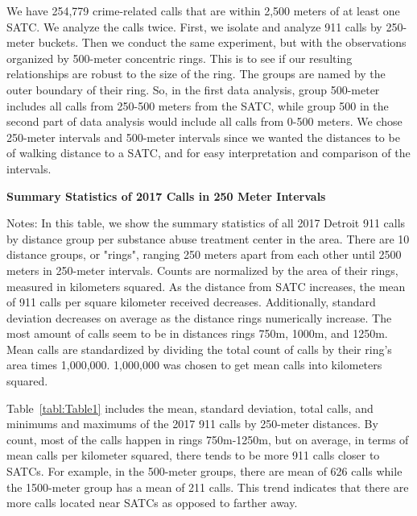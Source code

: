 \documentclass[12pt]{article}
\begin{document}
 We have 254,779 crime-related calls that are within 2,500 meters of at least one SATC. We analyze the calls twice. First, we isolate and analyze 911 calls by 250-meter buckets. Then we conduct the same experiment, but with the observations organized by 500-meter concentric rings. This is to see if our resulting relationships are robust to the size of the ring. The groups are named by the outer boundary of their ring. So, in the first data analysis, group 500-meter includes all calls from 250-500 meters from the SATC, while group 500 in the second part of data analysis would include all calls from 0-500 meters. We chose 250-meter intervals and 500-meter intervals since we wanted the distances to be of walking distance to a SATC, and for easy interpretation and comparison of the intervals. 
\begin{table}[H]
\centering
\scalebox{0.8}{
\centering

}
\caption{\textbf{Summary Statistics of 2017 Calls in 250 Meter Intervals}}
\label{tabl:Table1}
\centering\footnotesize{Notes: In this table, we show the summary statistics of all 2017 Detroit 911 calls by distance group per substance abuse treatment center in the area. There are 10 distance groups, or "rings", ranging 250 meters apart from each other until 2500 meters in 250-meter intervals. Counts are normalized by the area of their rings, measured in kilometers squared. As the distance from SATC increases, the mean of 911 calls per square kilometer received decreases. Additionally, standard deviation decreases on average as the distance rings numerically increase. The most amount of calls seem to be in distances rings 750m, 1000m, and 1250m. Mean calls are standardized by dividing the total count of calls by their ring's area times 1,000,000. 1,000,000 was chosen to get mean calls into kilometers squared.}
\end{table}  

Table~\ref{tabl:Table1} includes the mean, standard deviation, total calls, and minimums and maximums of the 2017 911 calls by 250-meter distances. By count, most of the calls happen in rings 750m-1250m, but on average, in terms of mean calls per kilometer squared, there tends to be more 911 calls closer to SATCs. For example, in the 500-meter groups, there are mean of 626 calls while the 1500-meter group has a mean of 211 calls. This trend indicates that there are more calls located near SATCs as opposed to farther away. 
\end{document}
